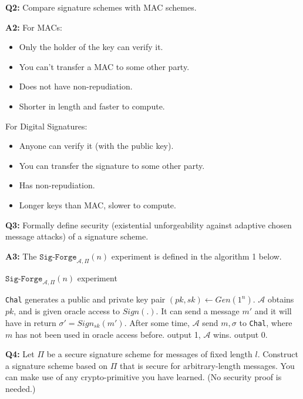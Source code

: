 \documentclass[12pt,reqno]{amsart}
\newcommand{\code}[1]{\texttt{#1}}
\newcommand{\advrs}[0]{\mathcal{A}}
\begin{document}
\vspace{20px}
\textbf{Q2:} Compare signature schemes with MAC schemes.

\textbf{A2:} 
For MACs:
\begin{itemize}
	\item Only the holder of the key can verify it.
	\item You can't transfer a MAC to some other party.
	\item Does not have non-repudiation.
	\item Shorter in length and faster to compute.
\end{itemize}

For Digital Signatures:
\begin{itemize}
	\item Anyone can verify it (with the public key).
	\item You can transfer the signature to some other party.
	\item Has non-repudiation.
	\item Longer keys than MAC, slower to compute.
\end{itemize}

\vspace{20px}
\textbf{Q3:} Formally define security (existential unforgeability against adaptive chosen message attacks) of a signature scheme.

\textbf{A3:} The $\code{Sig-Forge}_{\advrs,\Pi}(n)$ experiment is defined in the algorithm 1 below.
\begin{algorithm}
\caption{$\code{Sig-Forge}_{\advrs,\Pi}(n)$ experiment}
\begin{algorithmic}
\STATE \code{Chal} generates a public and private key pair $(pk, sk) \gets Gen(1^n)$.
\STATE $\advrs$ obtains $pk$, and is given oracle access to $Sign(.)$. It can send a message $m'$ and it will have in return $\sigma'=Sign_{sk}(m')$.
\STATE After some time, $\advrs$ send $m, \sigma$ to \code{Chal}, where $m$ has not been used in oracle access before.
	\STATE output 1, $\advrs$ wins.
\ELSE
	\STATE output 0.
\ENDIF
\end{algorithmic}
\end{algorithm}

\vspace{20px}
\textbf{Q4:} Let $\Pi$ be a secure signature scheme for messages of fixed length $l$. Construct a signature scheme based on $\Pi$ that is secure for arbitrary-length messages. You can make use of any crypto-primitive you have learned. (No security proof is needed.)
\end{document}

